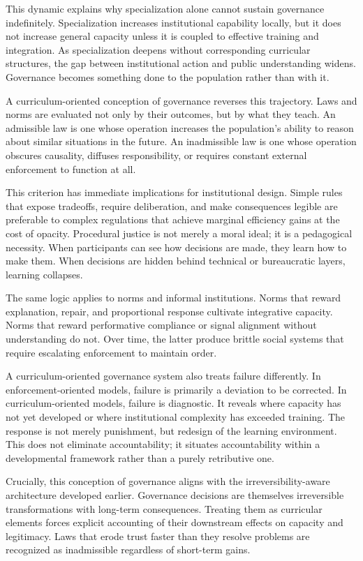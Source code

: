 \documentclass[12pt,oneside]{book}
\begin{document}
This dynamic explains why specialization alone cannot sustain governance indefinitely. Specialization increases institutional capability locally, but it does not increase general capacity unless it is coupled to effective training and integration. As specialization deepens without corresponding curricular structures, the gap between institutional action and public understanding widens. Governance becomes something done to the population rather than with it.

A curriculum-oriented conception of governance reverses this trajectory. Laws and norms are evaluated not only by their outcomes, but by what they teach. An admissible law is one whose operation increases the population’s ability to reason about similar situations in the future. An inadmissible law is one whose operation obscures causality, diffuses responsibility, or requires constant external enforcement to function at all.

This criterion has immediate implications for institutional design. Simple rules that expose tradeoffs, require deliberation, and make consequences legible are preferable to complex regulations that achieve marginal efficiency gains at the cost of opacity. Procedural justice is not merely a moral ideal; it is a pedagogical necessity. When participants can see how decisions are made, they learn how to make them. When decisions are hidden behind technical or bureaucratic layers, learning collapses.

The same logic applies to norms and informal institutions. Norms that reward explanation, repair, and proportional response cultivate integrative capacity. Norms that reward performative compliance or signal alignment without understanding do not. Over time, the latter produce brittle social systems that require escalating enforcement to maintain order.

A curriculum-oriented governance system also treats failure differently. In enforcement-oriented models, failure is primarily a deviation to be corrected. In curriculum-oriented models, failure is diagnostic. It reveals where capacity has not yet developed or where institutional complexity has exceeded training. The response is not merely punishment, but redesign of the learning environment. This does not eliminate accountability; it situates accountability within a developmental framework rather than a purely retributive one.

Crucially, this conception of governance aligns with the irreversibility-aware architecture developed earlier. Governance decisions are themselves irreversible transformations with long-term consequences. Treating them as curricular elements forces explicit accounting of their downstream effects on capacity and legitimacy. Laws that erode trust faster than they resolve problems are recognized as inadmissible regardless of short-term gains.
\end{document}
